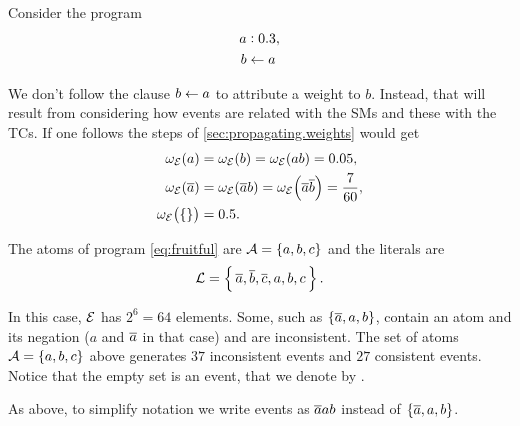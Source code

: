 \documentclass[x11names]{tlp}
\begin{document}
\ifExamples
	\begin{example}
		\label{example:not.syntax.propagation}
		\em

		Consider the program
		\begin{equation*}
			\begin{split}
				\weightfact{a & }{0.3},   %
				\\
				b           & \clause a
			\end{split}
		\end{equation*}

		We don't follow the clause $b \leftarrow a$ to attribute a weight to $b$.
		Instead, that will result from considering how events are related with the
		\aclp{SM} and these with the \aclp{TC}.		
		If one follows the steps of
		\cref{sec:propagating.weights} would get
		\begin{equation*}
			\begin{split}
				\wgtE\at{a}      & = \wgtE\at{b} = \wgtE\at{ab} = 0.05,                          %
				\\
				\wgtE\at{\co{a}} & = \wgtE\at{\co{a} b} = \wgtE\at{\co{a}\co{b}} = \frac{7}{60}, %
				\\
				\wgtE\at{\set{}} & = 0.5.                                                      %
				\\
			\end{split}
		\end{equation*}

	\end{example}
\fi

\ifExamples
	\begin{example}\label{ex:events}\em

		The atoms of program \cref{eq:fruitful} are ${\mathcal{A}} = \set{a, b, c}$ and
		the literals are
		\begin{equation*}
			{\mathcal{L}} = \set{\, \ensuremath{\overline{a}}, \ensuremath{\overline{b}}, \ensuremath{\overline{c}}, a, b, c\, }.
		\end{equation*}

		In this case, ${\mathcal{E}}$ has $2^6 = 64$ elements.
Some, such as
		$\set{\ensuremath{\overline{a}}, a, b}$, contain an atom and its negation ($a$ and $\overline{a}$ in
		that case) and are inconsistent.
The set of atoms ${\mathcal{A}} = \set{a, b, c}$
		above generates $37$ inconsistent events and $27$ consistent events.
Notice
		that the empty set is an event, that we denote by \emptyevent.

		As above, to simplify notation we write events as $\overline{a}ab$ instead of
		$\set{\ensuremath{\overline{a}}, a, b}$.
	\end{example}
\fi
\end{document}
